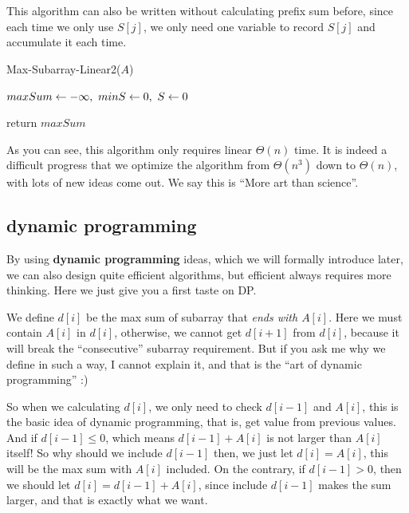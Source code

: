 \documentclass[11pt, a4paper]{COMP3711}
\begin{document}
\begin{spacing}{1.5}
    This algorithm can also be written without calculating prefix sum 
    before, since each time we only use $S[j]$, we only need one
    variable to record $S[j]$ and accumulate it each time.

    \begin{algorithm}
        \caption{Max-Subarray-Linear2($A$)}
        $maxSum \leftarrow -\infty,\ minS\leftarrow 0,\ S\leftarrow 0$

        return $maxSum$
    \end{algorithm}

    As you can see, this algorithm only requires linear $\Theta(n)$ time.
    It is indeed a difficult progress that we optimize the algorithm 
    from $\Theta(n^3)$ down to $\Theta(n)$, with lots of new ideas 
    come out. We say this is ``More art than science''.

    \subsection{dynamic programming}

    By using {\bf dynamic programming} ideas, which we will formally 
    introduce later, we can also design quite efficient algorithms,
    but efficient always requires more thinking.
    Here we just give you a first taste on DP.

    We define $d[i]$ be the max sum of subarray that {\it 
    ends with $A[i]$}. Here we must contain $A[i]$ in 
    $d[i]$, otherwise, we cannot get $d[i+1]$ from $d[i]$,
    because it will break the ``consecutive'' subarray requirement.
    But if you ask me why we define in such a way, I cannot 
    explain it, and that is the ``art of dynamic programming'' :)

    So when we calculating $d[i]$, we only need to check $d[i-1]$
    and $A[i]$, this is the basic idea of dynamic programming, 
    that is, get value from previous values.
    And if $d[i-1]\le 0$, which means $d[i-1]+A[i]$ is not larger than 
    $A[i]$ itself! So why should we include $d[i-1]$ then, 
    we just let $d[i]=A[i]$, this will be the max sum with 
    $A[i]$ included.
    On the contrary, if $d[i-1]>0$, then we should let 
    $d[i]=d[i-1]+A[i]$, since include $d[i-1]$ makes the sum 
    larger, and that is exactly what we want.


\end{spacing}
\end{document}
